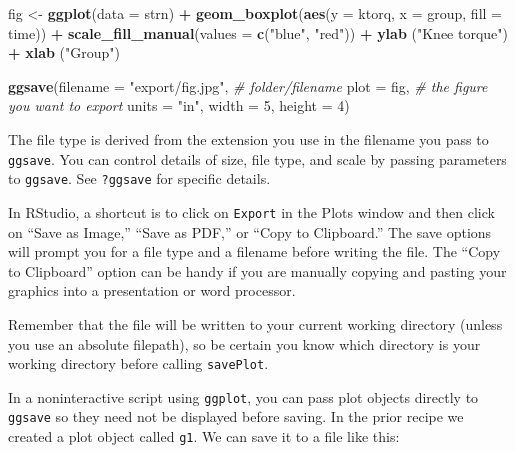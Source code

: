 \documentclass[
]{book}
\newenvironment{Shaded}{\begin{snugshade}}{\end{snugshade}}
\newcommand{\CommentTok}[1]{\textcolor[rgb]{0.56,0.35,0.01}{\textit{#1}}}
\newcommand{\DataTypeTok}[1]{\textcolor[rgb]{0.13,0.29,0.53}{#1}}
\newcommand{\DecValTok}[1]{\textcolor[rgb]{0.00,0.00,0.81}{#1}}
\newcommand{\KeywordTok}[1]{\textcolor[rgb]{0.13,0.29,0.53}{\textbf{#1}}}
\newcommand{\NormalTok}[1]{#1}
\newcommand{\OperatorTok}[1]{\textcolor[rgb]{0.81,0.36,0.00}{\textbf{#1}}}
\newcommand{\StringTok}[1]{\textcolor[rgb]{0.31,0.60,0.02}{#1}}
\begin{document}
\begin{Shaded}
\begin{Highlighting}[]
\NormalTok{fig <-}\StringTok{ }\KeywordTok{ggplot}\NormalTok{(}\DataTypeTok{data =}\NormalTok{ strn) }\OperatorTok{+}
\StringTok{  }\KeywordTok{geom_boxplot}\NormalTok{(}\KeywordTok{aes}\NormalTok{(}\DataTypeTok{y =}\NormalTok{ ktorq, }\DataTypeTok{x =}\NormalTok{ group, }\DataTypeTok{fill =}\NormalTok{ time)) }\OperatorTok{+}
\StringTok{  }\KeywordTok{scale_fill_manual}\NormalTok{(}\DataTypeTok{values =} \KeywordTok{c}\NormalTok{(}\StringTok{"blue"}\NormalTok{, }\StringTok{"red"}\NormalTok{)) }\OperatorTok{+}
\StringTok{  }\KeywordTok{ylab}\NormalTok{ (}\StringTok{"Knee torque"}\NormalTok{) }\OperatorTok{+}
\StringTok{  }\KeywordTok{xlab}\NormalTok{ (}\StringTok{"Group"}\NormalTok{)}

\KeywordTok{ggsave}\NormalTok{(}\DataTypeTok{filename =} \StringTok{"export/fig.jpg"}\NormalTok{, }\CommentTok{# folder/filename}
       \DataTypeTok{plot =}\NormalTok{ fig, }\CommentTok{# the figure you want to export}
       \DataTypeTok{units =} \StringTok{"in"}\NormalTok{, }
       \DataTypeTok{width =} \DecValTok{5}\NormalTok{, }
       \DataTypeTok{height =} \DecValTok{4}\NormalTok{) }
\end{Highlighting}
\end{Shaded}

The file type is derived from the extension you use in the filename you pass to \texttt{ggsave}. You can control details of size, file type, and scale by passing parameters to \texttt{ggsave}. See \texttt{?ggsave} for specific details.

In RStudio, a shortcut is to click on \texttt{Export} in the Plots window and then click on ``Save as Image,'' ``Save as PDF,'' or ``Copy to Clipboard.'' The save options will prompt you for a file type
and a filename before writing the file. The ``Copy to Clipboard'' option can be handy if you are manually copying and pasting your graphics into a presentation or word processor.

Remember that the file will be written to your current working directory
(unless you use an absolute filepath), so be certain you know which
directory is your working directory before calling \texttt{savePlot}.

In a noninteractive script using \texttt{ggplot}, you can pass plot objects directly to \texttt{ggsave} so they need not be displayed before saving. In the prior recipe we created a plot object called \texttt{g1}. We can save it to a file like this:
\end{document}
